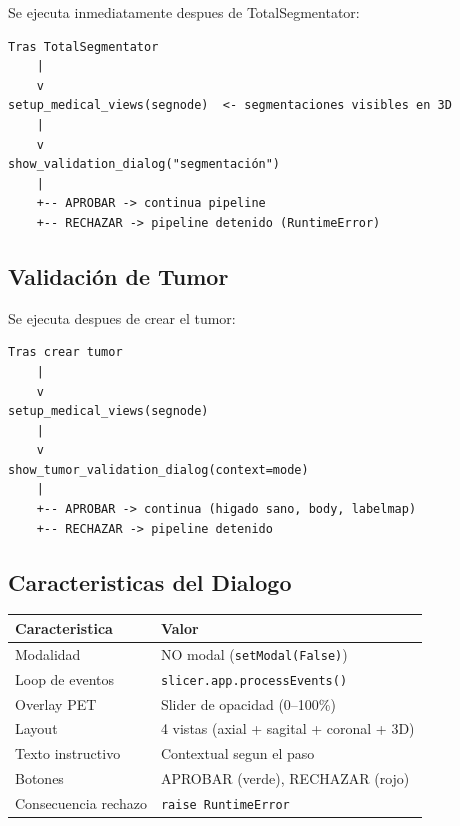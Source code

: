 \documentclass[12pt,a4paper]{article}
\begin{document}
Se ejecuta inmediatamente despues de TotalSegmentator:

\begin{lstlisting}
Tras TotalSegmentator
    |
    v
setup_medical_views(segnode)  <- segmentaciones visibles en 3D
    |
    v
show_validation_dialog("segmentación")
    |
    +-- APROBAR -> continua pipeline
    +-- RECHAZAR -> pipeline detenido (RuntimeError)
\end{lstlisting}

\subsection{Validación de Tumor}
\label{sec:validacion_tumor}

Se ejecuta despues de crear el tumor:

\begin{lstlisting}
Tras crear tumor
    |
    v
setup_medical_views(segnode)
    |
    v
show_tumor_validation_dialog(context=mode)
    |
    +-- APROBAR -> continua (higado sano, body, labelmap)
    +-- RECHAZAR -> pipeline detenido
\end{lstlisting}

\subsection{Caracteristicas del Dialogo}

\begin{table}[H]
\centering
\begin{tabular}{l l}
\toprule
\textbf{Caracteristica} & \textbf{Valor} \\
\midrule
Modalidad & NO modal (\texttt{setModal(False)}) \\
Loop de eventos & \texttt{slicer.app.processEvents()} \\
Overlay PET & Slider de opacidad (0--100\%) \\
Layout & 4 vistas (axial + sagital + coronal + 3D) \\
Texto instructivo & Contextual segun el paso \\
Botones & APROBAR (verde), RECHAZAR (rojo) \\
Consecuencia rechazo & \texttt{raise RuntimeError} \\
\bottomrule
\end{tabular}
\end{table}
\end{document}
